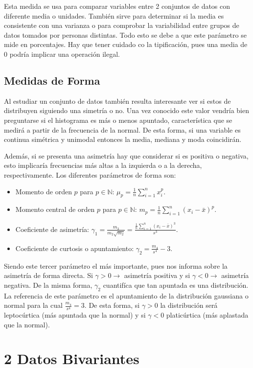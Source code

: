 \documentclass[10pt,a4paper]{book}
\newcommand{\cchap}[2]{
	\setcounter{chapter}{#1}
	\chapter*{\color{blue}\textbf{#1} \color{black} #2}
	\setcounter{section}{0}
}
\begin{document}
Esta medida se usa para comparar variables entre 2 conjuntos de datos con diferente media o unidades. También sirve para determinar si la media es consistente con una varianza o para comprobar la variabilidad entre grupos de datos tomados por personas distintas. Todo esto se debe a que este parámetro se mide en porcentajes. Hay que tener cuidado co la tipificación, pues una media de $0$ podría implicar una operación ilegal. 

\section{Medidas de Forma}
Al estudiar un conjunto de datos también resulta interesante ver si estos de distribuyen siguiendo una simetría o no. Una vez conocido este valor vendría bien preguntarse si el histograma es más o menos apuntado, característica que se medirá a partir de la frecuencia de la normal. De esta forma, si una variable es continua simétrica y unimodal entonces la media, mediana y moda coincidirán.

Además, si se presenta una asimetría hay que considerar si es positiva o negativa, esto implicaría frecuencias más altas a la izquierda o a la derecha, respectivamente. Los diferentes parámetros de forma son: 
\begin{itemize}
	\item Momento de orden $p$ para $p\in\mathbb{N}$: $\mu_p=\frac1{n}\sum\limits_{i=1}^nx_i^p$.
	\item Momento central de orden $p$ para $p\in\mathbb{N}$: $m_p = \frac1{n}\sum\limits_{i=1}^n(x_i-\bar x)^p$.
	\item Coeficiente de asimetría: $\gamma_1= \frac{m_3}{m_2\sqrt{m_2}} = \frac{\frac{1}{n}\sum_{i=1}^n(x_i-\bar x)^3}{s^3}$.
	\item Coeficiente de curtosis o apuntamiento: $\gamma_2 = \frac{m_4}{s^4}-3$.
\end{itemize}
Siendo este tercer parámetro el más importante, pues nos informa sobre la asimetría de forma directa. Si $\gamma > 0\longrightarrow$ asimetría positiva y si $\gamma < 0\longrightarrow$ asimetría negativa. De la misma forma, $\gamma_2$ cuantifíca que tan apuntada es una distribución. La referencia de este parámetro es el apuntamiento de la distribución gaussiana o normal para la cual $\frac{m_4}{s^4} = 3$. De esta forma, si $\gamma >0$ la distribución será leptocúrtica (más apuntada que la normal) y si $\gamma<0$ platicúrtica (más aplastada que la normal).

\cchap{2}{Datos Bivariantes}
\end{document}
